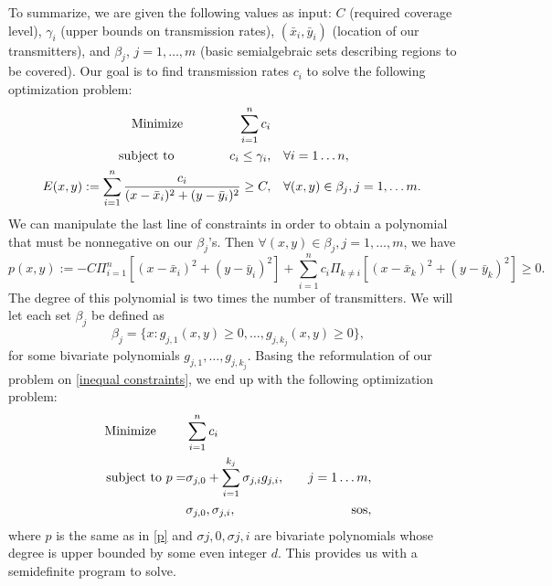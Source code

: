 	To summarize, we are given the following values as input: $C$ (required coverage level), $\gamma_i$ (upper bounds on transmission rates), $(\bar{x}_i , \bar{y}_i)$ (location of our transmitters), and $\beta_j$, $j = 1, \dots, m$ (basic semialgebraic sets describing regions to be covered). Our goal is to find transmission rates $c_i$ to solve the following optimization problem:
	\begin{equation}
		\begin{aligned}
		\textnormal{Minimize } \qquad \qquad \sum_{i=1}^{n} c_i \\
		\textnormal{subject to } \qquad \qquad c_i \leq \gamma_i, & \quad \forall i = 1 \dots n,\\
		E(x,y) := \sum_{i=1}^{n} \frac{c_i}{(x - \bar{x}_i)^2 + (y - \bar{y}_i)^2}  \geq C, & \quad \forall (x,y) \in \beta_j, j = 1, \dots m.
		\end{aligned}
	\end{equation}	
	We can manipulate the last line of constraints in order to obtain a polynomial that must be nonnegative on our $\beta_j$'s. Then $\forall (x,y) \in \beta_j, j = 1, \dots, m$, we have
	\begin{equation} \label{p}
		p(x, y) := -C \Pi_{i = 1}^{n} [(x - \bar{x}_i)^2 + (y - \bar{y}_i)^2] + \sum_{i = 1}^{n} c_i \Pi_{k \neq i} [(x - \bar{x}_k)^2 + (y - \bar{y}_k)^2] \geq 0.
	\end{equation}
	The degree of this polynomial is two times the number of transmitters. We will let each set $\beta_j$ be defined as
	$$
		\beta_j = \{x : g_{j, 1}(x,y) \geq 0, \dots, g_{j, k_{j}}(x,y) \geq 0 \}, 
	$$
	for some bivariate polynomials $g_{j, 1}, \dots, g_{j, k_{j}}$. Basing the reformulation of our problem on \eqref{inequal constraints}, we end up with the following optimization problem:
	\begin{equation}
		\begin{aligned}
		\textnormal{Minimize } \qquad &\sum_{i=1}^{n} c_i \\
		\textnormal{subject to } p =& \sigma_{j, 0} + \sum_{i=1}^{k_{j}} \sigma_{j, i} g_{j, i}, & \quad j = 1 \dots m,\\
		&\sigma_{j, 0}, \sigma_{j, i}, & \quad \textnormal{sos},
		\end{aligned}
	\end{equation}
	where $p$ is the same as in \eqref{p} and $\sigma{j, 0}, \sigma{j, i}$ are bivariate polynomials whose degree is upper bounded by some even integer $d$. This provides us with a semidefinite program to solve.
	
